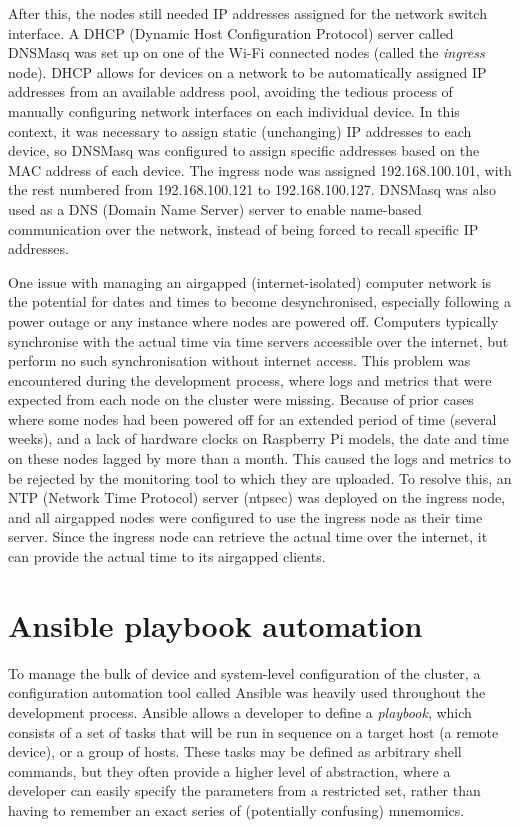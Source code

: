 
After this, the nodes still needed IP addresses assigned for the network switch interface. A DHCP (Dynamic Host Configuration Protocol) server called DNSMasq was set up on one of the Wi-Fi connected nodes (called the \textit{ingress} node). DHCP allows for devices on a network to be automatically assigned IP addresses from an available address pool, avoiding the tedious process of manually configuring network interfaces on each individual device. In this context, it was necessary to assign static (unchanging) IP addresses to each device, so DNSMasq was configured to assign specific addresses based on the MAC address of each device. The ingress node was assigned 192.168.100.101, with the rest numbered from 192.168.100.121 to 192.168.100.127. DNSMasq was also used as a DNS (Domain Name Server) server to enable name-based communication over the network, instead of being forced to recall specific IP addresses.


One issue with managing an airgapped (internet-isolated) computer network is the potential for dates and times to become desynchronised, especially following a power outage or any instance where nodes are powered off. Computers typically synchronise with the actual time via time servers accessible over the internet, but perform no such synchronisation without internet access. This problem was encountered during the development process, where logs and metrics that were expected from each node on the cluster were missing. Because of prior cases where some nodes had been powered off for an extended period of time (several weeks), and a lack of hardware clocks on Raspberry Pi models, the date and time on these nodes lagged by more than a month. This caused the logs and metrics to be rejected by the monitoring tool to which they are uploaded. To resolve this, an NTP (Network Time Protocol) server (ntpsec) was deployed on the ingress node, and all airgapped nodes were configured to use the ingress node as their time server. Since the ingress node can retrieve the actual time over the internet, it can provide the actual time to its airgapped clients.

\section{Ansible playbook automation}

To manage the bulk of device and system-level configuration of the cluster, a configuration automation tool called Ansible was heavily used throughout the development process. Ansible allows a developer to define a \textit{playbook}, which consists of a set of tasks that will be run in sequence on a target host (a remote device), or a group of hosts. These tasks may be defined as arbitrary shell commands, but they often provide a higher level of abstraction, where a developer can easily specify the parameters from a restricted set, rather than having to remember an exact series of (potentially confusing) mnemomics.

